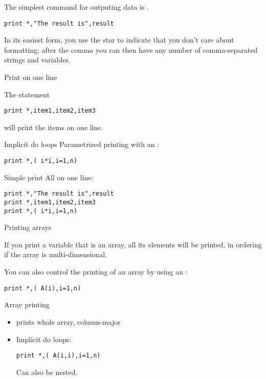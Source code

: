 The simplest command for outputing data is .
\begin{verbatim}
print *,"The result is",result
\end{verbatim}
In its easiest form, you use the star to indicate that you don't care
about formatting; after the comma you can then have any number of
comma-separated strings and variables.

 {Print on one line}

The statement
\begin{verbatim}
print *,item1,item2,item3
\end{verbatim}
will print the items on one line.

\begin{block}{Implicit do loops}
  \label{sl:print-implicit-loop}
  Parametrized printing with an :
\begin{verbatim}
print *,( i*i,i=1,n)
\end{verbatim}
\end{block}

\begin{slide}{Simple print}
  \label{sl:fio-print}
  All on one line:
\begin{verbatim}
print *,"The result is",result
print *,item1,item2,item3
print *,( i*i,i=1,n)  
\end{verbatim}
\end{slide}

 {Printing arrays}

If you print a variable that is an array, all its elements will be
printed, in  ordering if the array is
multi-dimensional.

You can also control the printing of an array by using an
:
\begin{verbatim}
print *,( A(i),i=1,n)
\end{verbatim}

\begin{slide}{Array printing}
  \label{sl:fprint-array}
  \begin{itemize}
  \item {} prints whole array, column-major
  \item Implicit do loops:
\begin{verbatim}
print *,( A(i,i),i=1,n)
\end{verbatim}
  Can also be nested.
  \end{itemize}
\end{slide}

